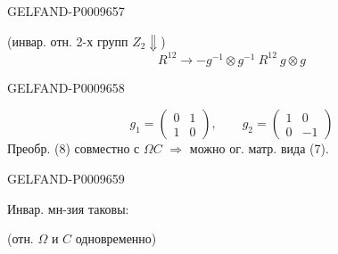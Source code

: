 \begin{GelfandAdjacentEvidence}{GELFAND-P000965}{7}


(инвар. отн. 2-х групп $Z_2\Downarrow$)
\begin{equation*}
 R^{12}\longrightarrow-g^{-1}\otimes g^{-1}\ R^{12}\ g\otimes g\tag{8}
\end{equation*}
\end{GelfandAdjacentEvidence}
\begin{GelfandAdjacentEvidence}{GELFAND-P000965}{8}

\begin{equation*}
 g_1=\begin{pmatrix}0&1\\1&0\end{pmatrix},\qquad
 g_2=\begin{pmatrix}1&0\\0&-1\end{pmatrix}\tag{9}
\end{equation*}
Преобр. (8) совместно с $\Omega C$ $\Rightarrow$ можно ог. матр. вида (7).
\end{GelfandAdjacentEvidence}
\begin{GelfandAdjacentEvidence}{GELFAND-P000965}{9}


Инвар. мн-зия таковы:
\end{GelfandAdjacentEvidence}


(отн. $\Omega$ и $C$ одновременно)

